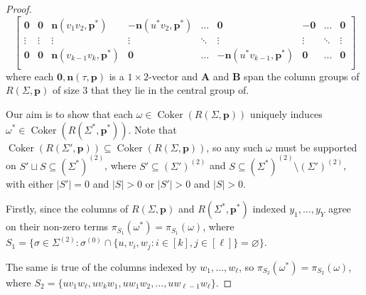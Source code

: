 \documentclass[11pt]{amsart}
\theoremstyle{definition}
\theoremstyle{remark}
\DeclareMathOperator{\coker}{Coker}
\begin{document}
\begin{proof}
\begin{equation}
\begin{bmatrix}
            \mathbf{0} & \mathbf{0} & \mathbf{n}(v_1v_2,\mathbf{p}^*) & -\mathbf{n}(u^*v_2,\mathbf{p}^*) & \dots & \mathbf{0} & -\mathbf{0} & \dots & \mathbf{0} \\
            \vdots & \vdots & \vdots & \vdots & \ddots & \vdots & \vdots & \ddots & \vdots \\ 
            \mathbf{0} & \mathbf{0} & \mathbf{n}(v_{k-1}v_k,\mathbf{p}^*) & \mathbf{0} & \dots & -\mathbf{n}(u^*v_{k-1},\mathbf{p}^*) & \mathbf{0} & \dots & \mathbf{0} \\
        \end{bmatrix}
    \end{equation}
    \normalsize
    where each $\mathbf{0},\mathbf{n}(\tau,\mathbf{p})$ is a $1\times 2$-vector and $\mathbf{A}$ and $\mathbf{B}$ span the column groups of $R(\Sigma,\mathbf{p})$ of size 3 that they lie in the central group of.

    Our aim is to show that each $\omega\in\coker(R(\Sigma,\mathbf{p}))$ uniquely induces $\omega^*\in\coker(R(\Sigma^*,\mathbf{p}^*))$.
    Note that $\coker(R(\Sigma',\mathbf{p}))\subseteq\coker(R(\Sigma,\mathbf{p}))$, so any such $\omega$ must be supported on $S'\sqcup S\subseteq(\Sigma^*)^{(2)}$, where $S'\subseteq(\Sigma')^{(2)}$ and $S\subseteq(\Sigma^*)^{(2)}\setminus(\Sigma')^{(2)}$, with either $|S'|=0$ and $|S|>0$ or $|S'|>0$ and $|S|>0$.

    Firstly, since the columns of $R(\Sigma,\mathbf{p})$ and $R(\Sigma^*,\mathbf{p}^*)$  indexed $y_1,\dots,y_Y$ agree on their non-zero terms $\pi_{S_1}(\omega^*)=\pi_{S_1}(\omega)$, where $S_1 = \{\sigma\in\Sigma^{(2)}:\sigma^{(0)}\cap\{u,v_i,w_j:i\in[k],j\in[\ell]\}=\varnothing\}$.

    The same is true of the columns indexed by $w_1,\dots,w_{\ell}$, so $\pi_{S_2}(\omega^*)=\pi_{S_2}(\omega)$, where $S_2=\{uv_1w_{\ell},uv_kw_1,uw_1w_2,\dots,uw_{\ell-1}w_{\ell}\}$.


\end{proof}
\end{document}
